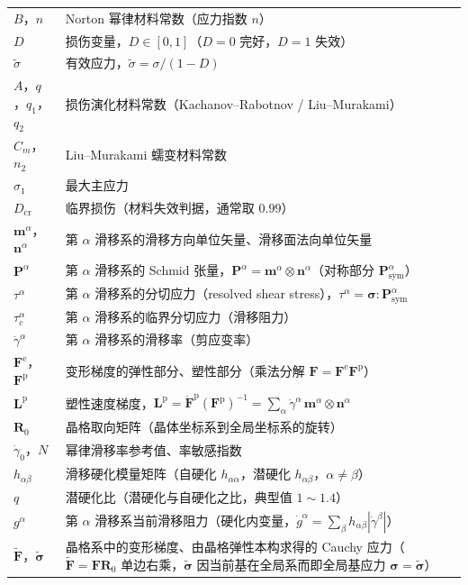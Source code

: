 \begin{longtable}{@{}p{4.8cm}>{\raggedright\arraybackslash}p{10.2cm}@{}}
  $B$，$n$ & Norton 幂律材料常数（应力指数 $n$） \\
  $D$ & 损伤变量，$D\in[0,1]$（$D=0$ 完好，$D=1$ 失效） \\
  $\tilde{\sigma}$ & 有效应力，$\tilde{\sigma}=\sigma/(1-D)$ \\
  $A$，$q$，$q_{1}$，$q_{2}$ & 损伤演化材料常数（Kachanov--Rabotnov / Liu--Murakami） \\
  $C_{m}$，$n_{2}$ & Liu--Murakami 蠕变材料常数 \\
  $\sigma_{1}$ & 最大主应力 \\
  $D_{\mathrm{cr}}$ & 临界损伤（材料失效判据，通常取 $0.99$） \\
  $\mathbf{m}^{\alpha}$，$\mathbf{n}^{\alpha}$ & 第 $\alpha$ 滑移系的滑移方向单位矢量、滑移面法向单位矢量 \\
  $\mathbf{P}^{\alpha}$ & 第 $\alpha$ 滑移系的 Schmid 张量，$\mathbf{P}^{\alpha}=\mathbf{m}^{\alpha}\otimes\mathbf{n}^{\alpha}$（对称部分 $\mathbf{P}^{\alpha}_{\mathrm{sym}}$） \\
  $\tau^{\alpha}$ & 第 $\alpha$ 滑移系的分切应力（resolved shear stress），$\tau^{\alpha}=\boldsymbol{\sigma}:\mathbf{P}^{\alpha}_{\mathrm{sym}}$ \\
  $\tau_{c}^{\alpha}$ & 第 $\alpha$ 滑移系的临界分切应力（滑移阻力） \\
  $\dot{\gamma}^{\alpha}$ & 第 $\alpha$ 滑移系的滑移率（剪应变率） \\
  $\mathbf{F}^{\mathrm{e}}$，$\mathbf{F}^{\mathrm{p}}$ & 变形梯度的弹性部分、塑性部分（乘法分解 $\mathbf{F}=\mathbf{F}^{\mathrm{e}}\mathbf{F}^{\mathrm{p}}$） \\
  $\mathbf{L}^{\mathrm{p}}$ & 塑性速度梯度，$\mathbf{L}^{\mathrm{p}}=\dot{\mathbf{F}}^{\mathrm{p}}(\mathbf{F}^{\mathrm{p}})^{-1}=\sum_{\alpha}\dot{\gamma}^{\alpha}\,\mathbf{m}^{\alpha}\otimes\mathbf{n}^{\alpha}$ \\
  $\mathbf{R}_{0}$ & 晶格取向矩阵（晶体坐标系到全局坐标系的旋转） \\
  $\dot{\gamma}_{0}$，$N$ & 幂律滑移率参考值、率敏感指数 \\
  $h_{\alpha\beta}$ & 滑移硬化模量矩阵（自硬化 $h_{\alpha\alpha}$，潜硬化 $h_{\alpha\beta}$，$\alpha\neq\beta$） \\
  $q$ & 潜硬化比（潜硬化与自硬化之比，典型值 $1\sim1.4$） \\
  $g^{\alpha}$ & 第 $\alpha$ 滑移系当前滑移阻力（硬化内变量，$\dot{g}^{\alpha}=\sum_{\beta}h_{\alpha\beta}|\dot{\gamma}^{\beta}|$） \\
  $\tilde{\mathbf{F}}$，$\tilde{\boldsymbol{\sigma}}$ & 晶格系中的变形梯度、由晶格弹性本构求得的 Cauchy 应力（$\tilde{\mathbf{F}}=\mathbf{F}\mathbf{R}_{0}$ 单边右乘，$\tilde{\boldsymbol{\sigma}}$ 因当前基在全局系而即全局基应力 $\boldsymbol{\sigma}=\tilde{\boldsymbol{\sigma}}$） \\

\end{longtable}
